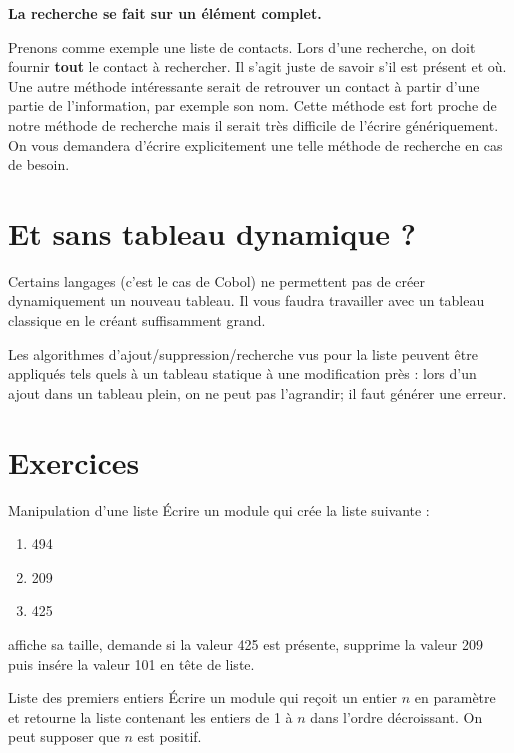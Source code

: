 \bigskip

\textbf{La recherche se fait sur un élément complet.}

Prenons comme exemple une liste de contacts.
Lors d'une recherche, on doit fournir
\textbf{tout} le contact à
rechercher. Il s'agit juste de savoir
s'il est présent et où. Une autre méthode intéressante
serait de retrouver un contact à partir d'une partie
de l'information, par exemple son nom. Cette méthode
est fort proche de notre méthode de recherche mais il serait très
difficile de l'écrire génériquement. On vous demandera
d'écrire explicitement une telle méthode de recherche
en cas de besoin.


\section{Et sans tableau dynamique ?}

Certains langages (c’est le cas de Cobol) ne permettent pas de créer
dynamiquement un nouveau tableau. Il vous faudra travailler avec un
tableau classique en le créant suffisamment grand.


Les algorithmes d’ajout/suppression/recherche vus pour la liste peuvent
être appliqués tels quels à un tableau statique à une modification près
: lors d’un ajout dans un tableau plein, on ne peut pas l’agrandir; il
faut générer une erreur.

\section{Exercices}

\begin{Exercice}{Manipulation d'une liste}
	Écrire un module qui crée la liste suivante :
	\begin{enumerate}
	\item 494
	\item 209
	\item 425
	\end{enumerate}
	affiche sa taille, demande si la valeur 425 est présente, 
	supprime la valeur 209 puis insére la valeur 101 en tête de liste.
\end{Exercice}

\begin{Exercice}{Liste des premiers entiers}
	Écrire un module qui reçoit un entier $n$ en paramètre et retourne la
	liste contenant les entiers de 1 à $n$ dans l'ordre
	décroissant. On peut supposer que $n$ est positif.
\end{Exercice}
	
